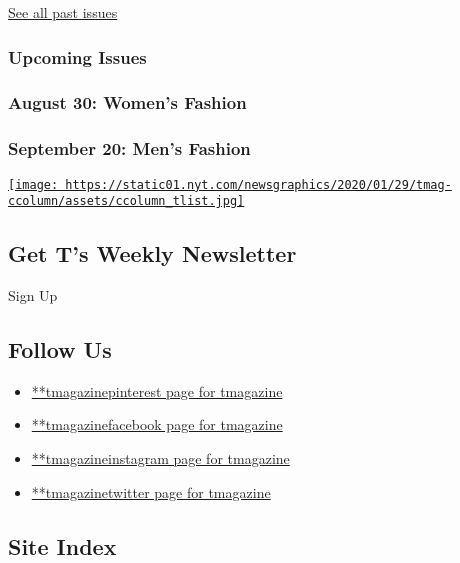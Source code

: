 \href{https://www.nytimes.com/interactive/2020/t-magazine/past-issues.html}{See
all past issues}

\hypertarget{upcoming-issues}{%
\subsubsection{Upcoming Issues}\label{upcoming-issues}}

\hypertarget{august-30-womens-fashion}{%
\subsubsection{August 30: Women's
Fashion}\label{august-30-womens-fashion}}

\hypertarget{september-20-mens-fashion}{%
\subsubsection{September 20: Men's
Fashion}\label{september-20-mens-fashion}}

\href{https://www.nytimes.com/newsletters/t-list}{\texttt{[image: https://static01.nyt.com/newsgraphics/2020/01/29/tmag-ccolumn/assets/ccolumn\_tlist.jpg]}}

\hypertarget{get-ts-weekly-newsletter}{%
\subsection{Get T's Weekly Newsletter}\label{get-ts-weekly-newsletter}}

Sign Up

\hypertarget{follow-us}{%
\subsection{Follow Us}\label{follow-us}}

\begin{itemize}
\tightlist
\item
  \href{https://pinterest.com/tmagazine}{**tmagazinepinterest page for
  tmagazine}
\item
  \href{https://www.facebook.com/tmagazine}{**tmagazinefacebook page for
  tmagazine}
\item
  \href{https://instagram.com/tmagazine}{**tmagazineinstagram page for
  tmagazine}
\item
  \href{https://twitter.com/tmagazine}{**tmagazinetwitter page for
  tmagazine}
\end{itemize}

\hypertarget{site-index}{%
\subsection{Site Index}\label{site-index}}

